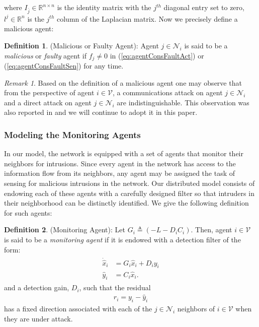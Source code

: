\documentclass{amsart}
\theoremstyle{definition}
\newtheorem{definition}{Definition}
\theoremstyle{remark}
\newtheorem{remark}{Remark}
\numberwithin{equation}{section}
\begin{document}
where $I_{\bar{j}} \in \mathbb{R}^{n \times n}$ is the identity matrix with the $j^{th}$ diagonal entry set to zero, $l^j \in \mathbb{R}^n$ is the $j^{th}$ column of the Laplacian matrix. Now we precisely define a malicious agent:
\begin{definition}
(Malicious or Faulty Agent): Agent $j \in \mathcal{N}_i$ is said to be a \textit{malicious} or \textit{faulty} agent if $f_j \neq 0$ in (\ref{eq:agentConsFaultAct}) or (\ref{eq:agentConsFaultSen}) for any time. 
\end{definition}
\begin{remark} \label{rem:rem1}
Based on the definition of a malicious agent one may observe that from the perspective of agent $i \in \mathcal{V}$, a communications attack on agent $j \in \mathcal{N}_i$ and a direct attack on agent $j\in \mathcal{N}_i$ are indistinguishable. This observation was also reported in \cite{Teix2010} and we will continue to adopt it in this paper. 
\end{remark}
\subsubsection{Modeling the Monitoring Agents}
In our model, the network is equipped with a set of agents that monitor their neighbors for intrusions. Since every agent in the network has access to the information flow from its neighbors, any agent may be assigned the task of sensing for malicious intrusions in the network. Our distributed model consists of endowing each of these agents with a carefully designed filter so that intruders in their neighborhood can be distinctly identified. We give the following definition for such agents:
\begin{definition}
(Monitoring Agent): Let $G_i \triangleq (-L-D_i C_i)$. Then, agent $i \in \mathcal{V}$ is said to be a \textit{monitoring agent} if it is endowed with a detection filter of the form:
\begin{gather}\label{eq:luenObsAgent}
\begin{aligned} 
\dot{\hat{x}}_i &= G_i\hat{x}_i +D_i y_i \\
\hat{y}_i &= C_i\hat{x}_i.
\end{aligned}
\end{gather}
and a detection gain, $D_i$, such that the residual
\begin{align} \label{eq:residual}
r_i = y_i-\hat{y}_i
\end{align}
has a fixed direction associated with each of the $j \in \mathcal{N}_i$ neighbors of $i \in \mathcal{V}$ when they are under attack.  
\end{definition}
\end{document}

